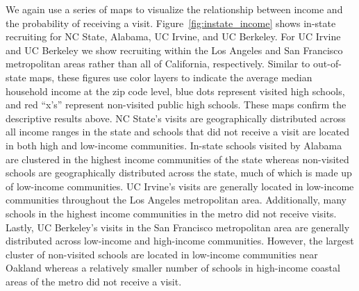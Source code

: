 \documentclass[twoside]{article}
\begin{document}


We again use a series of maps to visualize the relationship between income and the probability of receiving a visit. Figure~\ref{fig:instate_income} shows in-state recruiting for NC State, Alabama, UC Irvine, and UC Berkeley. For UC Irvine and UC Berkeley we show recruiting within the Los Angeles and San Francisco metropolitan areas rather than all of California, respectively. Similar to out-of-state maps, these figures use color layers to indicate the average median household income at the zip code level, blue dots represent visited high schools, and red ``x's'' represent non-visited public high schools. These maps confirm the descriptive results above. NC State's visits are geographically distributed across all income ranges in the state and schools that did not receive a visit are located in both high and low-income communities. In-state schools visited by Alabama are clustered in the highest income communities of the state whereas non-visited schools are geographically distributed across the state, much of which is made up of low-income communities. UC Irvine's visits are generally located in low-income communities throughout the Los Angeles metropolitan area. Additionally, many schools in the highest income communities in the metro did not receive visits. Lastly, UC Berkeley's visits in the San Francisco metropolitan area are generally distributed across low-income and high-income communities. However, the largest cluster of non-visited schools are located in low-income communities near Oakland whereas a relatively smaller number of schools in high-income coastal areas of the metro did not receive a visit.
\end{document}
